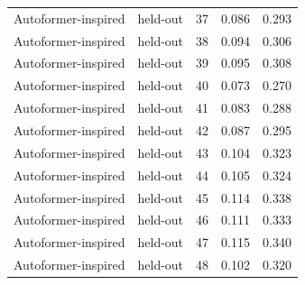 \begin{tabular}{llrrr}
Autoformer-inspired & held-out & 37 & 0.086 & 0.293 \\
Autoformer-inspired & held-out & 38 & 0.094 & 0.306 \\
Autoformer-inspired & held-out & 39 & 0.095 & 0.308 \\
Autoformer-inspired & held-out & 40 & 0.073 & 0.270 \\
Autoformer-inspired & held-out & 41 & 0.083 & 0.288 \\
Autoformer-inspired & held-out & 42 & 0.087 & 0.295 \\
Autoformer-inspired & held-out & 43 & 0.104 & 0.323 \\
Autoformer-inspired & held-out & 44 & 0.105 & 0.324 \\
Autoformer-inspired & held-out & 45 & 0.114 & 0.338 \\
Autoformer-inspired & held-out & 46 & 0.111 & 0.333 \\
Autoformer-inspired & held-out & 47 & 0.115 & 0.340 \\
Autoformer-inspired & held-out & 48 & 0.102 & 0.320 \\
\bottomrule
\end{tabular}

